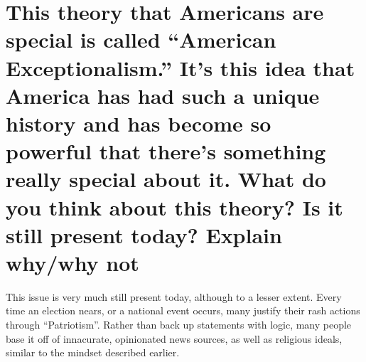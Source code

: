 \documentclass{scrartcl}
\begin{document}
\section{This theory that Americans are special is called “American Exceptionalism.” It’s this idea that America has had such a unique history and has become so powerful that there’s something really special about it. What do you think about this theory? Is it still present today? Explain why/why not}
\label{sec:orgda230da}
This issue is very much still present today, although to a lesser extent. Every
time an election nears, or a national event occurs, many justify their rash
actions through ``Patriotism''. Rather than back up statements with logic, many
people base it off of innacurate, opinionated news sources, as well as religious
ideals, similar to the mindset described earlier.
\end{document}
